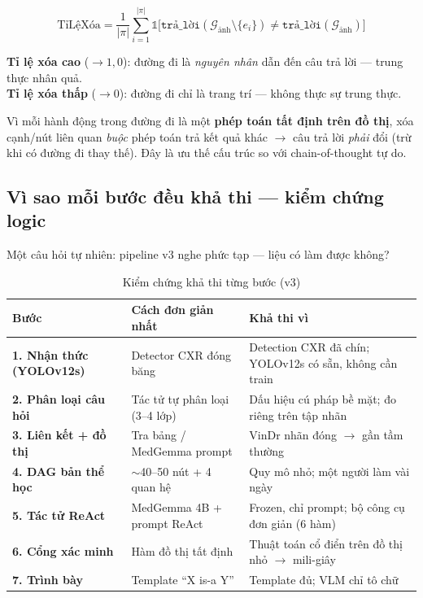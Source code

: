 \documentclass[11pt,a4paper]{article}
\begin{document}
\begin{equation}
\text{TỉLệXóa} = \frac{1}{|\pi|} \sum_{i=1}^{|\pi|} \mathbb{1}\big[\texttt{trả\_lời}(\mathcal{G}_\text{ảnh} \setminus \{e_i\}) \neq \texttt{trả\_lời}(\mathcal{G}_\text{ảnh})\big]
\end{equation}

\textbf{Tỉ lệ xóa cao} ($\to 1{,}0$): đường đi là \emph{nguyên nhân} dẫn đến câu trả lời --- trung thực nhân quả.\\
\textbf{Tỉ lệ xóa thấp} ($\to 0$): đường đi chỉ là trang trí --- không thực sự trung thực.

Vì mỗi hành động trong đường đi là một \textbf{phép toán tất định trên đồ thị}, xóa cạnh/nút liên quan \emph{buộc} phép toán trả kết quả khác $\to$ câu trả lời \emph{phải} đổi (trừ khi có đường đi thay thế). Đây là ưu thế cấu trúc so với chain-of-thought tự do.

\subsection{Vì sao mỗi bước đều khả thi --- kiểm chứng logic}

Một câu hỏi tự nhiên: pipeline v3 nghe phức tạp --- liệu có làm được không?

\begin{table}[H]
\centering\small
\renewcommand{\arraystretch}{1.35}
\begin{tabular}{>{\bfseries}p{2.4cm} p{4.3cm} p{5.3cm}}
\toprule
Bước & Cách đơn giản nhất & Khả thi vì \\
\midrule
1. Nhận thức (YOLOv12s) & Detector CXR đóng băng & Detection CXR đã chín; YOLOv12s có sẵn, không cần train \\
2. Phân loại câu hỏi & Tác tử tự phân loại (3--4 lớp) & Dấu hiệu cú pháp bề mặt; đo riêng trên tập nhãn \\
3. Liên kết + đồ thị & Tra bảng / MedGemma prompt & VinDr nhãn đóng $\to$ gần tầm thường \\
4. DAG bản thể học & $\sim$40--50 nút + 4 quan hệ & Quy mô nhỏ; một người làm vài ngày \\
5. Tác tử ReAct & MedGemma 4B + prompt ReAct & Frozen, chỉ prompt; bộ công cụ đơn giản (6 hàm) \\
6. Cổng xác minh & Hàm đồ thị tất định & Thuật toán cổ điển trên đồ thị nhỏ $\to$ mili-giây \\
7. Trình bày & Template ``X is-a Y'' & Template đủ; VLM chỉ tô chữ \\
\bottomrule
\end{tabular}
\caption{Kiểm chứng khả thi từng bước (v3)}
\end{table}
\end{document}
